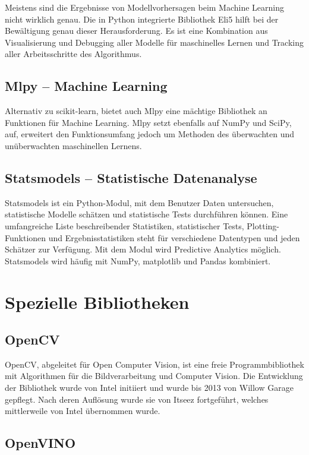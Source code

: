 Meistens sind die Ergebnisse von Modellvorhersagen beim Machine Learning nicht wirklich genau. Die in Python integrierte Bibliothek Eli5 hilft bei der Bewältigung genau dieser Herausforderung. Es ist eine Kombination aus Visualisierung und Debugging aller Modelle für maschinelles Lernen und Tracking aller Arbeitsschritte des Algorithmus.

\subsection{Mlpy – Machine Learning}

Alternativ zu scikit-learn, bietet auch Mlpy eine mächtige Bibliothek an Funktionen für Machine Learning. Mlpy setzt ebenfalls auf NumPy und SciPy, auf, erweitert den Funktionsumfang jedoch um Methoden des überwachten und unüberwachten maschinellen Lernens.

\subsection{Statsmodels – Statistische Datenanalyse}

Statsmodels ist ein Python-Modul, mit dem Benutzer Daten untersuchen, statistische Modelle schätzen und statistische Tests durchführen können. Eine umfangreiche Liste beschreibender Statistiken, statistischer Tests, Plotting-Funktionen und Ergebnisstatistiken steht für verschiedene Datentypen und jeden Schätzer zur Verfügung.
Mit dem Modul wird Predictive Analytics möglich. Statsmodels wird häufig mit NumPy, matplotlib und Pandas kombiniert.


\section{Spezielle Bibliotheken}


\subsection{OpenCV}


OpenCV, abgeleitet für Open Computer Vision, ist eine freie Programmbibliothek mit Algorithmen für die Bildverarbeitung und Computer Vision. Die Entwicklung der Bibliothek wurde von Intel initiiert und wurde bis 2013 von Willow Garage gepflegt. Nach deren Auflösung wurde sie von Itseez fortgeführt, welches mittlerweile von Intel übernommen wurde. \cite{OpenCV:2020b}


\subsection{OpenVINO}

